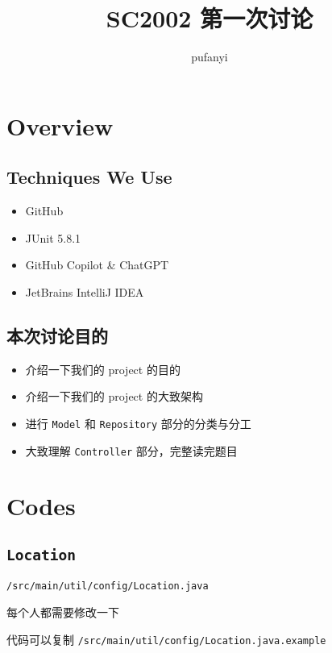 \documentclass[hyperref,UTF8,12pt,a4paper]{ctexart}
\title{SC2002 第一次讨论}
\author{pufanyi}
\date{}
\begin{document}
\maketitle

\newpage

\tableofcontents

\newpage

\section{Overview}

\subsection{Techniques We Use}

\begin{itemize}
	\item GitHub
	\item JUnit 5.8.1
	\item GitHub Copilot \& ChatGPT
	\item JetBrains IntelliJ IDEA
\end{itemize}

\subsection{本次讨论目的}

\begin{itemize}
	\item 介绍一下我们的 project 的目的
	\item 介绍一下我们的 project 的大致架构
	\item 进行 \texttt{Model} 和 \texttt{Repository} 部分的分类与分工
	\item 大致理解 \texttt{Controller} 部分，完整读完题目
\end{itemize}


\section{Codes}

\subsection{\texttt{Location}}

\texttt{/src/main/util/config/Location.java}

每个人都需要修改一下

代码可以复制 \texttt{/src/main/util/config/Location.java.example}
\end{document}
